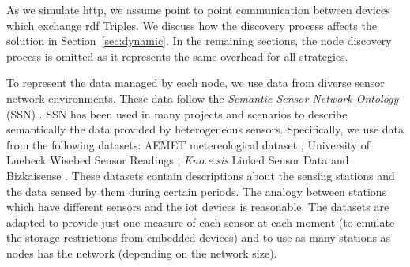As we simulate \ac{http}, we assume point to point communication between devices which exchange \ac{rdf} Triples.
We discuss how the discovery process affects the solution in Section~\ref{sec:dynamic}.
In the remaining sections, the node discovery process is omitted as it represents the same overhead for all strategies.


To represent the data managed by each node, we use data from diverse sensor network environments.
These data follow the \textit{Semantic Sensor Network Ontology} (SSN) .
SSN has been used in many projects and scenarios to describe semantically the data provided by heterogeneous sensors.
Specifically, we use data from the following datasets:
AEMET metereological dataset ,
University of Luebeck Wisebed Sensor Readings ,
\emph{Kno.e.sis} Linked Sensor Data 
and Bizkaisense .
These datasets contain descriptions about the sensing stations and the data sensed by them during certain periods.
The analogy between stations which have different sensors and the \ac{iot} devices is reasonable.
The datasets are adapted to provide just one measure of each sensor at each moment (to emulate the storage restrictions from embedded devices) and to use as many stations as nodes has the network (depending on the network size).

